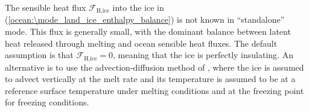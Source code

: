 The sensible heat flux $\mathcal{F}_\textrm{H,ice}$ into the ice in
(\ref{ocean:\mode_land_ice_enthalpy_balance}) is not known in ``standalone'' mode.  This flux
is generally small, with the dominant balance between latent heat released through melting
and ocean sensible heat fluxes.  The default assumption is that
$\mathcal{F}_\textrm{H,ice} = 0$, meaning that the ice is perfectly insulating.  An alternative
is to use the advection-diffusion method of \citet{Holland1999}, where the ice is assumed
to advect vertically at the melt rate and its temperature is assumed
to be at a reference surface temperature under melting conditions and at
the freezing point for freezing conditions.

